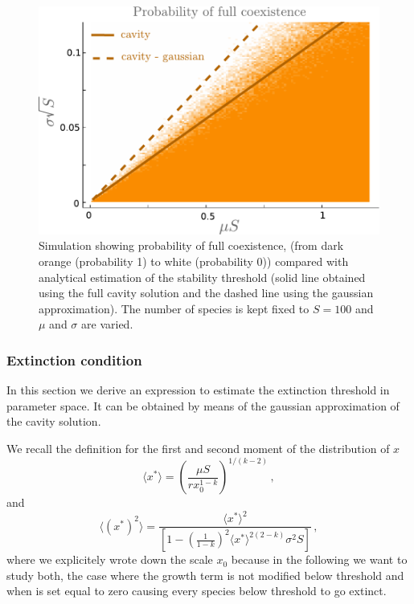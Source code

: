 \documentclass[10pt]{article}
\begin{document}
\begin{figure}[h!]
    \centering
    \includegraphics[width=.8\textwidth]{fig/SM-stability-cavity+gauss.pdf}
    \caption{Simulation showing probability of full coexistence, (from dark orange (probability 1)
    to white (probability 0)) compared with analytical estimation of the 
    stability threshold (solid line obtained 
    using the full cavity solution and
    the dashed line using the gaussian approximation).
    The number of species is kept fixed to $S=100$ and $\mu$ and $\sigma$
    are varied.}
    \label{fig: SM stability cavity + gaussian}
\end{figure}

\subsubsection{Extinction condition}
In this section we derive an expression to estimate the 
extinction threshold in parameter space. 
It can be obtained by means of the gaussian
approximation of the cavity solution.

We recall the definition for the first and
second moment of the distribution of $x$
\begin{equation}
    \langle x^* \rangle = \left(\frac{ \mu S}{rx_0^{1-k}}\right)^{1/(k-2)} \, ,
\end{equation}
and
\begin{equation}
    \langle (x^*)^2 \rangle = \frac{ \langle x^* \rangle^2}
    {\left[1-\left(\frac{1}{1-k}\right)^2\langle x^* \rangle^{2(2-k)}
    \sigma^2S\right]} \, ,
\end{equation}
where we explicitely wrote down the scale $x_0$ because
in the following we want to study both, the case
where the growth term is not modified below threshold
and when is set equal to zero causing every species below threshold
to go extinct.
\end{document}
